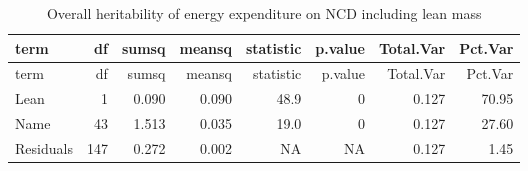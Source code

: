 \documentclass[]{article}
\newenvironment{Shaded}{\begin{snugshade}}{\end{snugshade}}
\newcommand{\DataTypeTok}[1]{\textcolor[rgb]{0.13,0.29,0.53}{#1}}
\newcommand{\DecValTok}[1]{\textcolor[rgb]{0.00,0.00,0.81}{#1}}
\newcommand{\KeywordTok}[1]{\textcolor[rgb]{0.13,0.29,0.53}{\textbf{#1}}}
\newcommand{\NormalTok}[1]{#1}
\newcommand{\OperatorTok}[1]{\textcolor[rgb]{0.81,0.36,0.00}{\textbf{#1}}}
\newcommand{\StringTok}[1]{\textcolor[rgb]{0.31,0.60,0.02}{#1}}
\begin{document}
\begin{longtable}[]{@{}lrrrrrrr@{}}
\caption{Overall heritability of energy expenditure on NCD including
lean mass}\tabularnewline
\toprule
term & df & sumsq & meansq & statistic & p.value & Total.Var &
Pct.Var\tabularnewline
\midrule
\endfirsthead
\toprule
term & df & sumsq & meansq & statistic & p.value & Total.Var &
Pct.Var\tabularnewline
\midrule
\endhead
Lean & 1 & 0.090 & 0.090 & 48.9 & 0 & 0.127 & 70.95\tabularnewline
Name & 43 & 1.513 & 0.035 & 19.0 & 0 & 0.127 & 27.60\tabularnewline
Residuals & 147 & 0.272 & 0.002 & NA & NA & 0.127 & 1.45\tabularnewline
\bottomrule
\end{longtable}

\begin{Shaded}
\end{Shaded}
\end{document}
